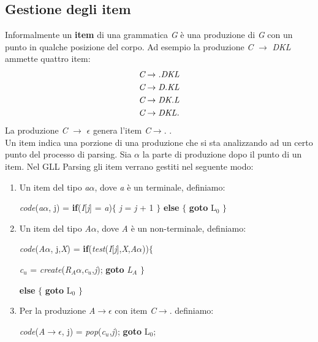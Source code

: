 \subsection{Gestione degli item}
Informalmente un \textbf{item} \cite{libro: compilatori} di una grammatica \textit{G} è una produzione di \textit{G} con un punto in qualche posizione del corpo. Ad esempio la produzione \textit{C} $\to$ \textit{DKL} ammette quattro item:
\begin{align}
	\textit{C} & \to \textit{.DKL} \notag \\
	\textit{C} & \to \textit{D.KL} \notag \\
	\textit{C} & \to \textit{DK.L} \notag \\
	\textit{C} & \to \textit{DKL.} \notag 
\end{align}
La produzione \textit{C} $\to$ $\epsilon$ genera l'item \textit{C}$\to$. .\\
Un item indica una porzione di una produzione che si sta analizzando ad un certo punto del processo di parsing. Sia $\alpha$ la parte di produzione dopo il punto di un item. Nel GLL Parsing gli item verrano gestiti nel seguente modo: 
\begin{enumerate}
	\item Un item del tipo \textit{a}$\alpha$, dove \textit{a} è un terminale, definiamo:\par
	\textit{code}(\textit{a}$\alpha$, j) = \textbf{if}(\textit{I}[\textit{j}] = \textit{a})$\{$ \textit{j} = \textit{j} + 1 $\}$ \textbf{else} $\{$ \textbf{goto} L$_0$ $\}$
	\item Un item del tipo \textit{A}$\alpha$, dove \textit{A} è un non-terminale, definiamo:\par
	\textit{code}(\textit{A}$\alpha$, j,\textit{X}) = \textbf{if}(\textit{test}(\textit{I}[\textit{j}],\textit{X},\textit{A}$\alpha$))$\{$ \par 
	\hspace{4cm}\textit{c}$_u$ = \textit{create}(\textit{R}$_A\alpha$,\textit{c}$_u$,\textit{j}); \textbf{goto} \textit{L}$_A$ $\}$ \par 
	\hspace{3cm}\textbf{else} $\{$ \textbf{goto} L$_0$ $\}$
	\item Per la produzione \textit{A}$\to$$\epsilon$ con item \textit{C}$\to$. definiamo: \par
	\hspace{1cm}\textit{code}(\textit{A}$\to$$\epsilon$, j) = \textit{pop}(\textit{c}$_u$,\textit{j}); \textbf{goto} L$_0$;
\end{enumerate}
